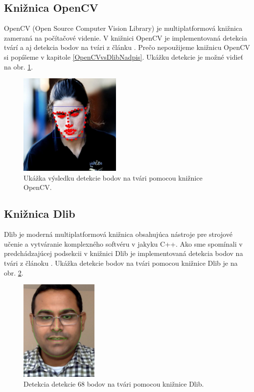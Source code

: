 \subsection{Knižnica OpenCV}
OpenCV \cite{openCv} (Open Source Computer Vision Library) je multiplatformová knižnica zameraná na počítačové videnie.
V knižnici OpenCV je implementovaná detekcia tvárí a aj detekcia bodov na tvári z článku \cite{kazemi2014one}. 
Prečo nepoužijeme knižnicu OpenCV si popíšeme v kapitole \ref{OpenCVvsDlibNadpis}. 
Ukážku detekcie je možné vidieť na obr. \ref{pic-openCv}. 

\begin{figure}[H]
	\begin{center}
		\includegraphics[height=5cm]{pics/openCv.jpg}
		\caption{Ukážka výsledku detekcie bodov na tvári pomocou knižnice OpenCV.
		 \cite{openCv}}
		\label{pic-openCv}
	\end{center}
\end{figure}

\subsection{Knižnica Dlib} \label{DlibNadpis}
Dlib\cite{dlib} je moderná multiplatformová knižnica obsahujúca nástroje pre strojové učenie a vytváranie komplexného softvéru v jakyku C++. 
Ako sme spomínali v pred\-chá\-dza\-jú\-cej podsekcii v knižnici Dlib je implementovaná detekcia bodov na tvári z článoku \cite{kazemi2014one}. 
Ukážka detekcie bodov na tvári pomocou knižnice Dlib je na obr. \ref{pic-dlibUkazka}.

\begin{figure}[H]
	\begin{center}
		\includegraphics[height=5cm]{pics/dlib.jpg}
		\caption{Detekcia detekcie 68 bodov na tvári pomocou knižnice Dlib.
		 \cite{dlibUkazka}}
		\label{pic-dlibUkazka}
	\end{center}
\end{figure}

